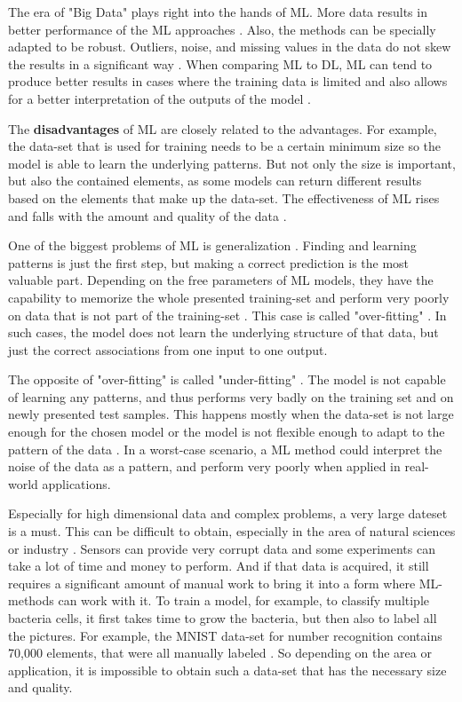 The era of "Big Data" plays right into the hands of ML. More data results in better performance of the ML approaches \cite{Wuest}. Also, the methods can be specially adapted to be robust. Outliers, noise, and missing values in the data do not skew the results in a significant way \cite{Theodoridis}. When comparing ML to DL, ML can tend to produce better results in cases where the training data is limited and also allows for a better interpretation of the outputs of the model \cite{Janiesch}.

The \textbf{disadvantages} of ML are closely related to the advantages. For example, the data-set that is used for training needs to be a certain minimum size so the model is able to learn the underlying patterns. But not only the size is important, but also the contained elements, as some models can return different results based on the elements that make up the data-set. The effectiveness of ML rises and falls with the amount and quality of the data \cite{Janiesch, Bishop}.

One of the biggest problems of ML is generalization \cite{Bishop}. Finding and learning patterns is just the first step, but making a correct prediction is the most valuable part. Depending on the free parameters of ML models, they have the capability to memorize the whole presented training-set and perform very poorly on data that is not part of the training-set \cite{Zhangpiml}. This case is called "over-fitting" \cite{Jabbar}. In such cases, the model does not learn the underlying structure of that data, but just the correct associations from one input to one output. 

The opposite of "over-fitting" is called "under-fitting" \cite{Jabbar}. The model is not capable of learning any patterns, and thus performs very badly on the training set and on newly presented test samples. This happens mostly when the data-set is not large enough for the chosen model or the model is not flexible enough to adapt to the pattern of the data \cite{Will}. In a worst-case scenario, a ML method could interpret the noise of the data as a pattern, and perform very poorly when applied in real-world applications.\newline

Especially for high dimensional data and complex problems, a very large dateset is a must. This can be difficult to obtain, especially in the area of natural sciences or industry \cite{Wuest}. Sensors can provide very corrupt data and some experiments can take a lot of time and money to perform. And if that data is acquired, it still requires a significant amount of manual work to bring it into a form where ML-methods can work with it. To train a model, for example, to classify multiple bacteria cells, it first takes time to grow the bacteria, but then also to label all the pictures. For example, the MNIST data-set for number recognition contains 70,000 elements, that were all manually labeled \cite{Pavlo}. So depending on the area or application, it is impossible to obtain such a data-set that has the necessary size and quality. 

